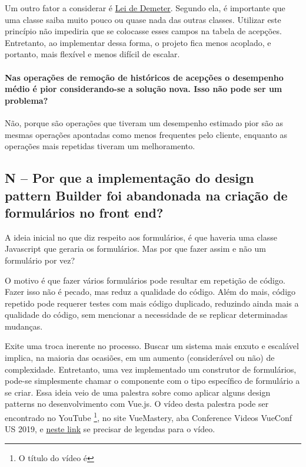 Um outro fator a considerar é \href{https://pt.wikipedia.org/wiki/Lei_de_Demeter}{Lei de Demeter}. Segundo ela, é
importante que uma classe saiba muito pouco ou quase nada das outras classes.
Utilizar este princípio não impediria que se colocasse esses campos na tabela de acepções.
Entretanto, ao implementar dessa forma, o projeto fica menos acoplado, e portanto, mais flexível e menos difícil
de escalar.

\paragraph{Nas operações de remoção de históricos de acepções o desempenho médio é pior considerando-se a solução
nova. Isso não pode ser um problema?}

Não, porque são operações que tiveram um desempenho estimado pior são as mesmas operações apontadas como
menos frequentes pelo cliente, enquanto as operações mais repetidas tiveram um melhoramento.

\subsection{N -- Por que a implementação do design pattern Builder foi abandonada na criação de formulários no front end?}
\label{subsec:nuxt-left-design-pattern-builder}

A ideia inicial no que diz respeito aos formulários, é que haveria uma classe Javascript que geraria os
formulários.
Mas por que fazer assim e não um formulário por vez?

O motivo é que fazer vários formulários pode resultar em repetição de código. Fazer isso não é pecado, mas reduz
a qualidade do código. Além do mais, código repetido pode requerer testes com mais código duplicado, reduzindo
ainda mais a qualidade do código, sem mencionar a necessidade de se replicar determinadas mudanças.

Exite uma troca inerente no processo. Buscar um sistema mais enxuto e escalável implica, na maioria das ocasiões, em um
aumento (considerável ou não) de complexidade. Entretanto, uma vez implementado um construtor de formulários, pode-se
simplesmente chamar o componente com o tipo específico de formulário a se criar. Essa ideia veio de uma palestra sobre
como aplicar alguns design patterns no desenvolvimento com Vue.js. O vídeo desta palestra pode ser encontrado no YouTube
\footnote{O título do vídeo é }, no site VueMastery, aba
Conference Videos \dir VueConf US 2019, e \href{https://read-and-watch.github.io/videos/RF1bbhRw9sg/index.html}{neste link}
se precisar de legendas para o vídeo.

